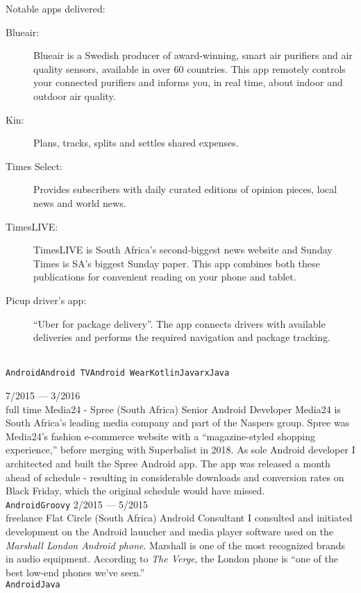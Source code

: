 \documentclass[9pt]{developercv} %
\begin{document}
\begin{entrylist}
{		Notable apps delivered:
		{\small\begin{description}
		\item[Blueair:] Blueair is a Swedish producer of award-winning, smart air purifiers and air quality sensors, available in over 60 countries. This app remotely controls your connected purifiers and informs you, in real time, about indoor and outdoor air quality.
\item[Kin:] Plans, tracks, splits and settles shared expenses.
\item[Times Select:] Provides subscribers with daily curated editions of opinion pieces, local news and world news.
\item[TimesLIVE:] TimesLIVE is South Africa's second-biggest news website and Sunday Times is SA's biggest Sunday paper. This app combines both these publications for convenient reading on your phone and tablet.
\item[Picup driver's app:] “Uber for package delivery”. The app connects drivers with available deliveries and performs the required navigation and package tracking.
		\end{description}}\\ \texttt{Android}\slashsep\texttt{Android TV}\slashsep\texttt{Android Wear}\slashsep\texttt{Kotlin}\slashsep\texttt{Java}\slashsep\texttt{rxJava}}
	\entry
		{7/2015 --- 3/2016\\\footnotesize{full time}}
		{Media24 - Spree {\normalfont\small (South Africa)}}
		{Senior Android Developer}
		{Media24 is South Africa's leading media company and part of the Naspers group. Spree was Media24's fashion e-commerce website with a “magazine-styled shopping experience,” before merging with Superbalist in 2018. As sole Android developer I architected and built the Spree Android app. The app was released a month ahead of schedule - resulting in considerable downloads and conversion rates on Black Friday, which the original schedule would have missed.\\ \texttt{Android}\slashsep\texttt{Groovy}}
	\entry
		{2/2015 --- 5/2015\\\footnotesize{freelance}}
		{Flat Circle {\normalfont\small (South Africa)}}
		{Android Consultant}
		{I consulted and initiated development on the Android launcher and media player software used on the \textit{Marshall London Android phone}. Marshall is one of the most recognized brands in audio equipment. According to \textit{The Verge}, the London phone is “one of the best low-end phones we've seen.”\\ \texttt{Android}\slashsep\texttt{Java}}

\end{entrylist}
\end{document}
